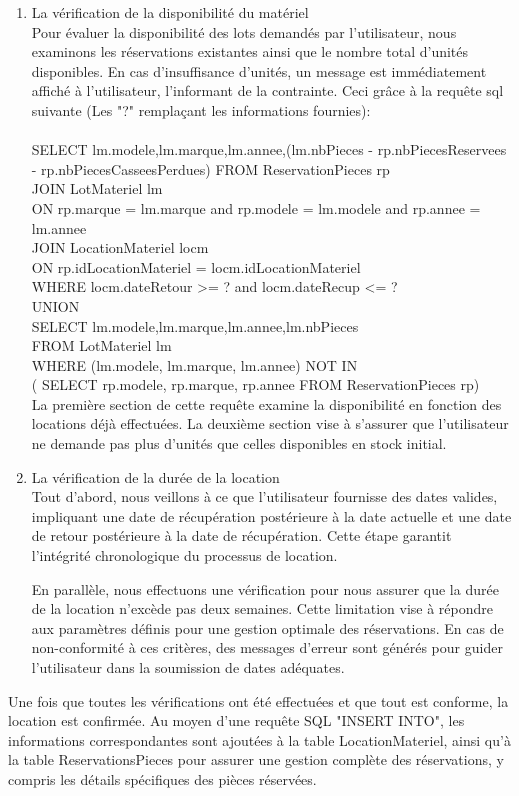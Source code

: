 \begin{enumerate}
    \item La vérification de la disponibilité du matériel\\
    Pour évaluer la disponibilité des lots demandés par l'utilisateur, nous examinons les réservations existantes ainsi que le nombre total d'unités disponibles. En cas d'insuffisance d'unités, un message est immédiatement affiché à l'utilisateur, l'informant de la contrainte.
    Ceci grâce à la requête sql suivante (Les "?" remplaçant les informations fournies): \\
    \\
        SELECT lm.modele,lm.marque,lm.annee,(lm.nbPieces - rp.nbPiecesReservees - rp.nbPiecesCasseesPerdues)
                FROM ReservationPieces rp \\
                JOIN  LotMateriel lm \\
                ON rp.marque = lm.marque and rp.modele = lm.modele and rp.annee = lm.annee \\
                JOIN LocationMateriel locm \\
                ON rp.idLocationMateriel = locm.idLocationMateriel\\ 
                WHERE locm.dateRetour >= ? and locm.dateRecup <= ? \\
                UNION \\
                SELECT lm.modele,lm.marque,lm.annee,lm.nbPieces \\
                FROM LotMateriel lm \\
                WHERE (lm.modele, lm.marque, lm.annee) NOT IN \\
                ( SELECT rp.modele, rp.marque, rp.annee FROM ReservationPieces rp)\\
    La première section de cette requête examine la disponibilité en fonction des locations déjà effectuées. La deuxième section vise à s'assurer que l'utilisateur ne demande pas plus d'unités que celles disponibles en stock initial.
    \item La vérification de la durée de la location\\
    Tout d'abord, nous veillons à ce que l'utilisateur fournisse des dates valides, impliquant une date de récupération postérieure à la date actuelle et une date de retour postérieure à la date de récupération. Cette étape garantit l'intégrité chronologique du processus de location.
    
    En parallèle, nous effectuons une vérification pour nous assurer que la durée de la location n'excède pas deux semaines. Cette limitation vise à répondre aux paramètres définis pour une gestion optimale des réservations. En cas de non-conformité à ces critères, des messages d'erreur sont générés pour guider l'utilisateur dans la soumission de dates adéquates.
\end{enumerate}
Une fois que toutes les vérifications ont été effectuées et que tout est conforme, la location est confirmée. Au moyen d'une requête SQL "INSERT INTO", les informations correspondantes sont ajoutées à la table LocationMateriel, ainsi qu'à la table ReservationsPieces pour assurer une gestion complète des réservations, y compris les détails spécifiques des pièces réservées.


